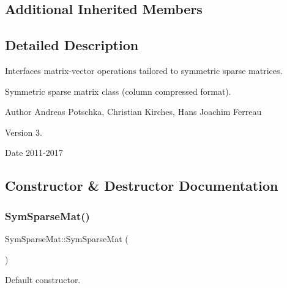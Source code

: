 \subsection*{Additional Inherited Members}


\subsection{Detailed Description}
Interfaces matrix-\/vector operations tailored to symmetric sparse matrices. 

Symmetric sparse matrix class (column compressed format).

\begin{DoxyAuthor}{Author}
Andreas Potschka, Christian Kirches, Hans Joachim Ferreau 
\end{DoxyAuthor}
\begin{DoxyVersion}{Version}
3. 
\end{DoxyVersion}
\begin{DoxyDate}{Date}
2011-\/2017 
\end{DoxyDate}


\subsection{Constructor \& Destructor Documentation}
\mbox{\label{class_sym_sparse_mat_a8063b880d4656db6e956c0b73259a00d}} 
\subsubsection{\texorpdfstring{Sym\+Sparse\+Mat()}{SymSparseMat()}\hspace{0.1cm}{\footnotesize\ttfamily [1/3]}}
{\footnotesize\ttfamily Sym\+Sparse\+Mat\+::\+Sym\+Sparse\+Mat (\begin{DoxyParamCaption}{ }\end{DoxyParamCaption})\hspace{0.3cm}{\ttfamily [inline]}}

Default constructor. \mbox{\label{class_sym_sparse_mat_ad8e4399253ee8d7295482fb4c647918c}} 
